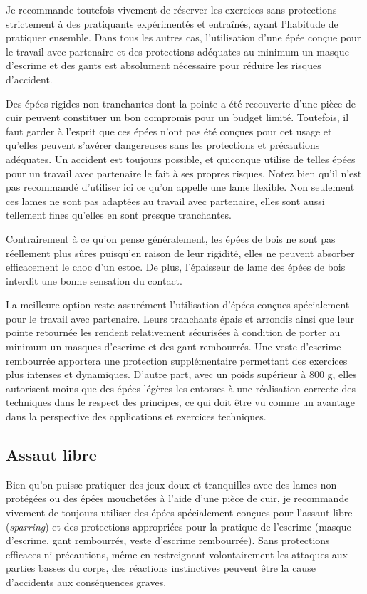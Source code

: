 Je recommande toutefois vivement de réserver les exercices sans protections strictement à des pratiquants expérimentés et entraînés, ayant l'habitude de pratiquer ensemble. Dans tous les autres cas, l'utilisation d'une épée conçue pour le travail avec partenaire et des protections adéquates  \textendash{} au minimum un masque d'escrime et des gants \textendash{} est absolument nécessaire pour réduire les risques d'accident.

Des épées rigides non tranchantes dont la pointe a été recouverte d'une pièce de cuir peuvent constituer un bon compromis pour un budget limité. Toutefois, il faut garder à l'esprit que ces épées n'ont pas été conçues pour cet usage et qu'elles peuvent s'avérer dangereuses sans les protections et précautions adéquates. Un accident est toujours possible, et quiconque utilise de telles épées pour un travail avec partenaire le fait à ses propres risques. Notez bien qu'il n'est pas recommandé d'utiliser ici ce qu'on appelle une lame flexible. Non seulement ces lames ne sont pas adaptées au travail avec partenaire, elles sont aussi tellement fines qu'elles en sont presque tranchantes.

Contrairement à ce qu'on pense généralement, les épées de bois ne sont pas réellement plus sûres puisqu'en raison de leur rigidité, elles ne peuvent absorber efficacement le choc d'un estoc. De plus, l'épaisseur de lame des épées de bois interdit une bonne sensation du contact.

La meilleure option reste assurément l'utilisation d'épées conçues spécialement pour le travail avec partenaire. Leurs tranchants épais et arrondis ainsi que leur pointe retournée les rendent relativement sécurisées à condition de porter au minimum un masques d'escrime et des gant rembourrés. Une veste d'escrime rembourrée apportera une protection supplémentaire permettant des exercices plus intenses et dynamiques. 
D'autre part, avec un poids supérieur à 800 g, elles autorisent moins que des épées légères les entorses à une réalisation correcte des techniques dans le respect des principes, ce qui doit être vu comme un avantage dans la perspective des applications et exercices techniques.



\subsection{Assaut libre}
Bien qu'on puisse pratiquer des jeux doux et tranquilles avec des lames non protégées ou des épées mouchetées à l'aide d'une pièce de cuir, je recommande vivement de toujours utiliser des épées spécialement conçues pour l'assaut libre (\textit{sparring}) et des protections appropriées pour la pratique de l'escrime (masque d'escrime, gant rembourrés, veste d'escrime rembourrée).
Sans protections efficaces ni précautions, même en restreignant volontairement les attaques aux parties basses du corps, des réactions instinctives peuvent être la cause d'accidents aux conséquences graves. 

